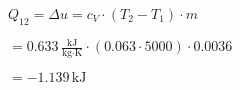 \( Q_{12} = \Delta u = c_V \cdot (T_2 - T_1) \cdot m \)  

\( = 0.633 \, \frac{\text{kJ}}{\text{kg} \cdot \text{K}} \cdot (0.063 \cdot 5000) \cdot 0.0036 \)  

\( = -1.139 \, \text{kJ} \)